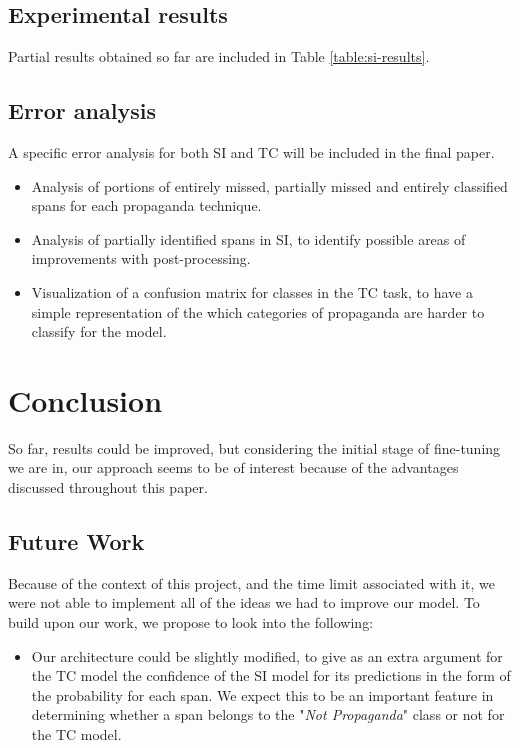 \documentclass[11pt]{article}
\newcommand{\pol}[1]{{\fontfamily{pcr}\selectfont#1}}
\begin{document}
\subsection{Experimental results} \label{sec:results}
Partial results obtained so far are included in Table \ref{table:si-results}.

\subsection{Error analysis}
A specific error analysis for both \pol{SI} and \pol{TC} will be included in the final paper. 
\begin{itemize}
    \item Analysis of portions of entirely missed, partially missed and entirely classified spans for each propaganda technique.
    \item Analysis of partially identified spans in \pol{SI}, to identify possible areas of improvements with post-processing.
    \item Visualization of a confusion matrix for classes in the \pol{TC} task, to have a simple representation of the which categories of propaganda are harder to classify for the model.
\end{itemize}

\section{Conclusion}
So far, results could be improved, but considering the initial stage of fine-tuning we are in, our approach seems to be of interest because of the advantages discussed throughout this paper.

\subsection{Future Work}
Because of the context of this project, and the time limit associated with it, we were not able to implement all of the ideas we had to improve our model. To build upon our work, we propose to look into the following:
\begin{itemize}
    \item Our architecture could be slightly modified, to give as an extra argument for the \pol{TC} model the confidence of the \pol{SI} model for its predictions in the form of the probability for each span. We expect this to be an important feature in determining whether a span belongs to the "\textit{Not Propaganda}" class or not for the \pol{TC} model.
\end{itemize}

\nocite{}




\end{document}
